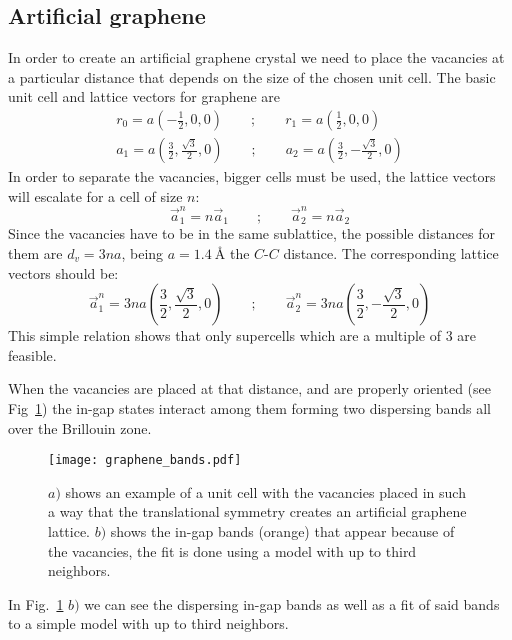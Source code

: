 \documentclass[a4paper]{article}
\renewcommand{\red}[1]{\textcolor{red}{#1}}
\begin{document}
\subsection{Artificial graphene}
In order to create an artificial graphene crystal we need to place the vacancies at a particular distance that depends on the size of the chosen unit cell.
The basic unit cell and lattice vectors for graphene are
\begin{equation}
\begin{split}
  r_0 = a\left(-\frac{1}{2},0,0\right) \qquad ; \qquad
  r_1 = a\left(\frac{1}{2},0,0\right)\\
  a_1 = a\left(\frac{3}{2},\frac{\sqrt{3}}{2},0\right) \qquad ; \qquad
  a_2 = a\left(\frac{3}{2},-\frac{\sqrt{3}}{2},0\right)
\end{split}
\end{equation}
In order to separate the vacancies, bigger cells must be used, the lattice vectors will escalate for a cell of size $n$:
\begin{equation}
  \vec{a}^n_1 = n \vec{a}_1 \qquad ; \qquad \vec{a}^n_2 = n \vec{a}_2
\end{equation}
Since the vacancies have to be in the same sublattice, the possible distances for them are $d_v = 3na$, being $a=\SI{1.4}{\angstrom}$ the $C$-$C$ distance. The corresponding lattice vectors should be:
\begin{equation}
  \vec{a}^n_1 = 3na\left(\frac{3}{2},\frac{\sqrt{3}}{2},0\right) \qquad ; \qquad
  \vec{a}^n_2 = 3na\left(\frac{3}{2},-\frac{\sqrt{3}}{2},0\right)
\end{equation}
This simple relation shows that only supercells which are a multiple of 3 are feasible.



When the vacancies are placed at that distance, and are properly oriented (see Fig~\ref{graphene}) the in-gap states interact among them forming two dispersing bands all over the Brillouin zone.
\begin{figure}[h!]
  \centering
  \texttt{[image: graphene\_bands.pdf]}
  \vspace{-5pt}
  \caption{$a)$ shows an example of a unit cell with the vacancies placed in such a way that the translational symmetry creates an artificial graphene lattice. $b)$ shows the in-gap bands (orange) that appear because of the vacancies, the fit is done using a model with up to third neighbors.}
  \label{graphene}
\end{figure}
\FloatBarrier
In Fig.~\ref{graphene} $b)$ we can see the dispersing in-gap bands as well as a fit of said bands to a simple model with up to third neighbors.
\end{document}
